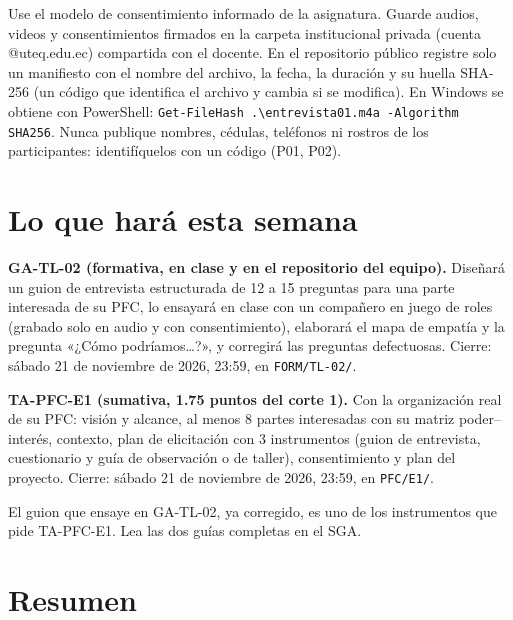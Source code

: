 \documentclass[11pt,a4paper,oneside]{report}
\begin{document}
\begin{enlapractica}
	Use el modelo de consentimiento informado de la asignatura. Guarde audios, videos y consentimientos firmados en la carpeta institucional privada (cuenta @uteq.edu.ec) compartida con el docente. En el repositorio público registre solo un manifiesto con el nombre del archivo, la fecha, la duración y su huella SHA-256 (un código que identifica el archivo y cambia si se modifica). En Windows se obtiene con PowerShell: \texttt{Get-FileHash .\textbackslash entrevista01.m4a -Algorithm SHA256}. Nunca publique nombres, cédulas, teléfonos ni rostros de los participantes: identifíquelos con un código (P01, P02).
\end{enlapractica}

\section{Lo que hará esta semana}

\begin{cajapfc}
	\textbf{GA-TL-02 (formativa, en clase y en el repositorio del equipo).} Diseñará un guion de entrevista estructurada de 12 a 15 preguntas para una parte interesada de su PFC, lo ensayará en clase con un compañero en juego de roles (grabado solo en audio y con consentimiento), elaborará el mapa de empatía y la pregunta «¿Cómo podríamos\ldots?», y corregirá las preguntas defectuosas. Cierre: sábado 21 de noviembre de 2026, 23:59, en \texttt{FORM/TL-02/}.

	\textbf{TA-PFC-E1 (sumativa, 1.75 puntos del corte 1).} Con la organización real de su PFC: visión y alcance, al menos 8 partes interesadas con su matriz poder--interés, contexto, plan de elicitación con 3 instrumentos (guion de entrevista, cuestionario y guía de observación o de taller), consentimiento y plan del proyecto. Cierre: sábado 21 de noviembre de 2026, 23:59, en \texttt{PFC/E1/}.

	El guion que ensaye en GA-TL-02, ya corregido, es uno de los instrumentos que pide TA-PFC-E1. Lea las dos guías completas en el SGA.
\end{cajapfc}

\section*{Resumen}
\end{document}
